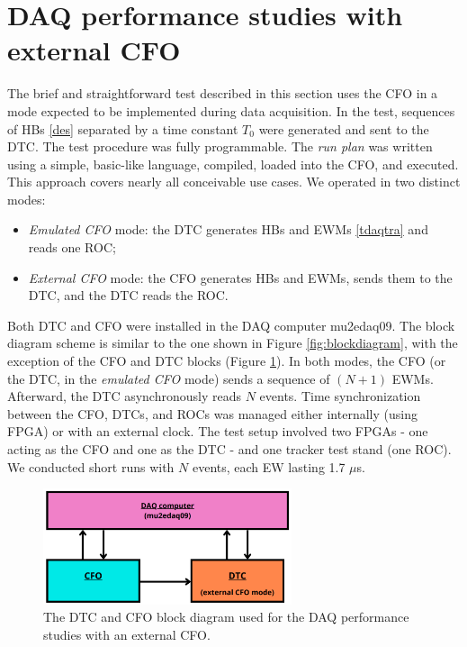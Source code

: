 \section{DAQ performance studies with external CFO}
The brief and straightforward test described in this section uses the CFO in a mode expected to be 
implemented during data acquisition. 
In the test, sequences of HBs \ref{des} separated by a time constant  
\( T_0 \) were generated and sent to the DTC. The test procedure was fully programmable. 
The \textit{run plan} was written using a simple, basic-like language, 
compiled, loaded into the CFO, and executed. This approach covers nearly 
all conceivable use cases. We operated in two distinct modes:
\begin{itemize}
  \item \textit{Emulated CFO} mode: the DTC generates HBs and 
  EWMs \ref{tdaqtra} and reads one ROC;
  \item \textit{External CFO} mode: the CFO generates HBs and 
  EWMs, sends them to the DTC, and the DTC reads the ROC.
\end{itemize}
Both DTC and CFO were installed in the DAQ computer mu2edaq09. 
The block diagram scheme is similar to the one shown in Figure \ref{fig:blockdiagram}, 
with the exception of the CFO and DTC blocks (Figure \ref{fig:secondtest}).
In both modes, the CFO (or the DTC, in the \textit{emulated CFO} mode) 
sends a sequence of \( (N+1) \) EWMs. Afterward, the DTC 
asynchronously reads \( N \) events. 
Time synchronization between the CFO, DTCs, and ROCs was managed either 
internally (using FPGA) or with an external clock. 
The test setup involved two FPGAs - one acting as the CFO and 
one as the DTC - and one tracker test stand (one ROC). 
We conducted short runs with \( N \) events, each EW lasting  1.7 $\mu$s. 

\begin{figure}[!h]
  \centering
  \includegraphics[width=0.65\textwidth]{figures/png/Screenshot_20240714_131546.png}
  \caption{The DTC and CFO block diagram 
  used for the DAQ performance studies with an external CFO.}
  \label{fig:secondtest}
\end{figure}



